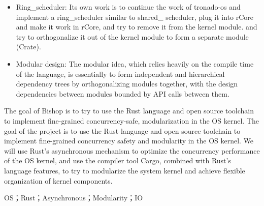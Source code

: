 \begin{itemize}
\item Ring\_scheduler: Its own work is to continue the work of tronado-os and implement a ring\_scheduler similar to shared\_
scheduler, plug it into rCore and make it work in rCore, and try to remove it from the kernel module.
and try to orthogonalize it out of the kernel module to form a separate module (Crate).

\item Modular design: The modular idea, which relies heavily on the compile time of the language, is essentially to form independent and hierarchical dependency trees by orthogonalizing modules together, with the design dependencies between modules bounded by API calls between them.
\end{itemize}


The goal of Bishop is to try to use the Rust language and open source toolchain to implement fine-grained concurrency-safe, modularization in the OS kernel.
The goal of the project is to use the Rust language and open source toolchain to implement fine-grained concurrency safety and modularity in the OS kernel. We will use Rust's asynchronous mechanism to optimize the concurrency performance of the OS kernel, and use the compiler tool Cargo, combined with Rust's language features, to try to modularize the system kernel and achieve flexible organization of kernel components.

\keywordsen\quad OS；Rust；Asynchronous；Modularity；IO